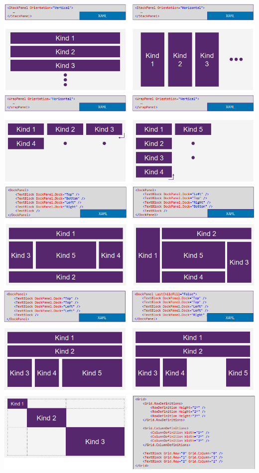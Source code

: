 \documentclass[10pt,landscape,a4paper]{article}
\begin{document}
\begin{multicols*}{3}
\includegraphics[scale=0.4]{images/stackpanel.PNG}\\
\includegraphics[scale=0.4]{images/wrappanel.PNG}\\
\includegraphics[scale=0.4]{images/dockpanel.PNG}\\
\includegraphics[scale=0.4]{images/dockpanel2.PNG}\\
\includegraphics[scale=0.4]{images/grid1.PNG}\\

\end{multicols*}
\end{document}
